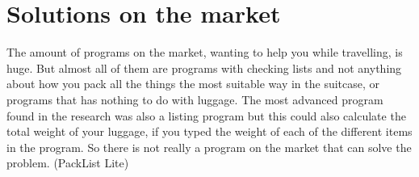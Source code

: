 \section{Solutions on the market}

The amount of programs on the market, wanting to help you while travelling, is huge. But almost all of them are programs with checking lists and not anything about how you pack all the things the most suitable way in the suitcase, or programs that has nothing to do with luggage. The most advanced program found in the research was also a listing program but this could also calculate the total weight of your luggage, if you typed the weight of each of the different items in the program. So there is not really a program on the market that can solve the problem. (PackList Lite)